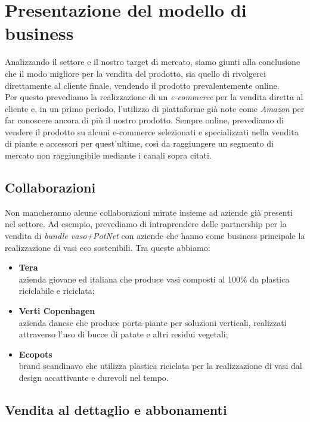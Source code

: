 \newpage
\section{Presentazione del modello di business}

Analizzando il settore e il nostro target di mercato, siamo giunti alla conclusione che il modo migliore per la vendita del prodotto, sia quello di rivolgerci direttamente al cliente finale, vendendo il prodotto prevalentemente online.\\Per questo prevediamo la realizzazione di un \textit{e-commerce} per la vendita diretta al cliente e, in un primo periodo, l'utilizzo di piattaforme già note come \textit{Amazon} per far conoscere ancora di più il nostro prodotto. Sempre online, prevediamo di vendere il prodotto su alcuni e-commerce selezionati e specializzati nella vendita di piante e accessori per quest'ultime, così da raggiungere un segmento di mercato non raggiungibile mediante i canali sopra citati.

\subsection{Collaborazioni}

Non mancheranno alcune collaborazioni mirate insieme ad aziende già presenti nel settore. Ad esempio, prevediamo di intraprendere delle partnership per la vendita di \textit{bundle vaso+PotNet} con aziende che hanno come business principale la realizzazione di vasi eco sostenibili. Tra queste abbiamo:
\begin{itemize}
	\item \textbf{Tera}\\
	azienda giovane ed italiana che produce vasi composti al 100\% da plastica riciclabile e riciclata;
	\item \textbf{Verti Copenhagen}\\
	azienda danese che produce porta-piante per soluzioni verticali, realizzati attraverso l'uso di bucce di patate e altri residui vegetali;
	\item \textbf{Ecopots}\\
	brand scandinavo che utilizza plastica riciclata per la realizzazione di vasi dal design accattivante e durevoli nel tempo.
\end{itemize}


\subsection{Vendita al dettaglio e abbonamenti}


